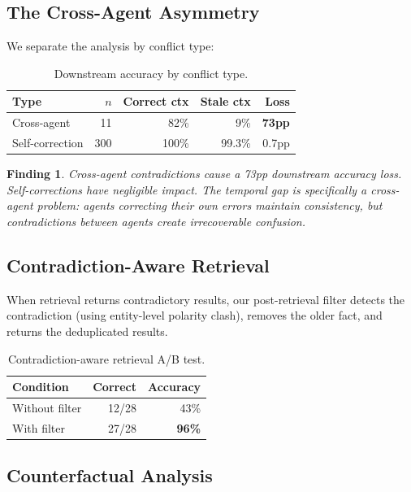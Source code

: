 \documentclass[sigconf]{acmart}
\newtheorem{finding}{Finding}
\begin{document}
\subsection{The Cross-Agent Asymmetry}

We separate the analysis by conflict type:

\begin{table}[h]
\centering
\small
\caption{Downstream accuracy by conflict type.}
\begin{tabular}{lrrrr}
\toprule
Type & $n$ & Correct ctx & Stale ctx & Loss \\
\midrule
Cross-agent & 11 & 82\% & 9\% & \textbf{73pp} \\
Self-correction & 300 & 100\% & 99.3\% & 0.7pp \\
\bottomrule
\end{tabular}
\label{tab:asymmetry}
\end{table}

\begin{finding}
Cross-agent contradictions cause a 73pp downstream accuracy loss. Self-corrections have negligible impact. The temporal gap is specifically a \emph{cross-agent} problem: agents correcting their own errors maintain consistency, but contradictions between agents create irrecoverable confusion.
\end{finding}

\subsection{Contradiction-Aware Retrieval}

When retrieval returns contradictory results, our post-retrieval filter detects the contradiction (using entity-level polarity clash), removes the older fact, and returns the deduplicated results.

\begin{table}[h]
\centering
\small
\caption{Contradiction-aware retrieval A/B test.}
\begin{tabular}{lrr}
\toprule
Condition & Correct & Accuracy \\
\midrule
Without filter & 12/28 & 43\% \\
With filter & 27/28 & \textbf{96\%} \\
\bottomrule
\end{tabular}
\label{tab:retrieval}
\end{table}

\subsection{Counterfactual Analysis}
\end{document}
